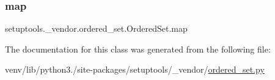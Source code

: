 \subsubsection{\texorpdfstring{map}{map}}
{\footnotesize\ttfamily setuptools.\+\_\+vendor.\+ordered\+\_\+set.\+Ordered\+Set.\+map}



The documentation for this class was generated from the following file\+:\begin{DoxyCompactItemize}
\item 
venv/lib/python3./site-\/packages/setuptools/\+\_\+vendor/\hyperlink{ordered__set_8py}{ordered\+\_\+set.\+py}\end{DoxyCompactItemize}

